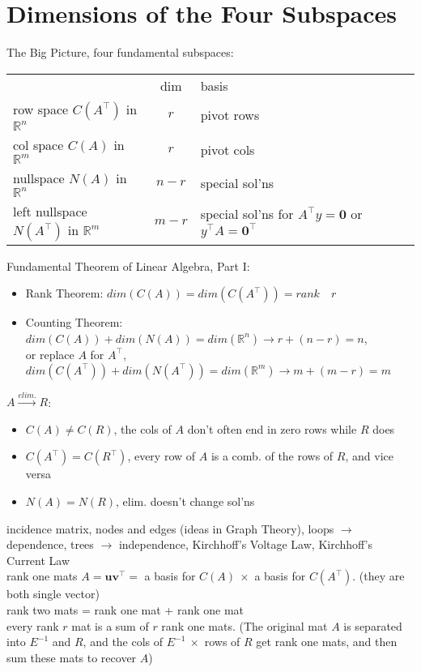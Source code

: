 \documentclass{report}
\begin{document}
\section{Dimensions of the Four Subspaces}
The Big Picture, four fundamental subspaces: 
\begin{center}
    \quad \begin{tabular}{lc | lc | lc}
        & dim & basis \\
        row space $C(A^\top)$ in $\mathbb{R}^n$ & $r$ & pivot rows \\
        col space $C(A)$ in $\mathbb{R}^m$ & $r$ & pivot cols \\
        nullspace $N(A)$ in $\mathbb{R}^n$ & $n - r$ & special sol'ns \\
        left nullspace $N(A^\top)$ in $\mathbb{R}^m$ & $m - r$ & special sol'ns for $A^\top y = \mathbf{0}$ 
        or $y^\top A = \mathbf{0}^\top$
    \end{tabular}
\end{center}
Fundamental Theorem of Linear Algebra, Part \textrm{I}: 
\begin{itemize}
    \item Rank Theorem: $dim(C(A)) = dim(C(A^\top)) = rank \quad r$ \\
    \item Counting Theorem: $dim(C(A)) + dim(N(A)) = dim(\mathbb{R}^n) \rightarrow r + (n - r) = n$, \\
          or replace $A$ for $A^\top$, $dim(C(A^\top)) + dim(N(A^\top)) = dim(\mathbb{R}^m) \rightarrow m + (m - r) = m$ \\
\end{itemize}
$A \xrightarrow{elim.} R$: 
\begin{itemize}
    \item $C(A) \neq C(R)$, the cols of $A$ don't often end in zero rows while $R$ does \\
    \item $C(A^\top) = C(R^\top)$, every row of $A$ is a comb. of the rows of $R$, and vice versa \\
    \item $N(A) = N(R)$, elim. doesn't change sol'ns
\end{itemize}
incidence matrix, nodes and edges (ideas in Graph Theory), loops $\rightarrow$ dependence, 
trees $\rightarrow$ independence, Kirchhoff's Voltage Law, Kirchhoff's Current Law \\
rank one mats $A = \mathbf{uv}^\top =$ a basis for $C(A) \ \times$ a basis for $C(A^\top)$. (they are both single vector) \\
rank two mats = rank one mat + rank one mat \\
every rank $r$ mat is a sum of $r$ rank one mats. 
(The original mat $A$ is separated into $E^{-1}$ and $R$, and the cols of $E^{-1} \ \times$ rows of $R$ get 
rank one mats, and then sum these mats to recover $A$)
\end{document}
